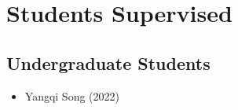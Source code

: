\section{Students Supervised}

\subsection{Undergraduate Students}
\begin{itemize}
\item Yangqi Song (2022)
\end{itemize}
